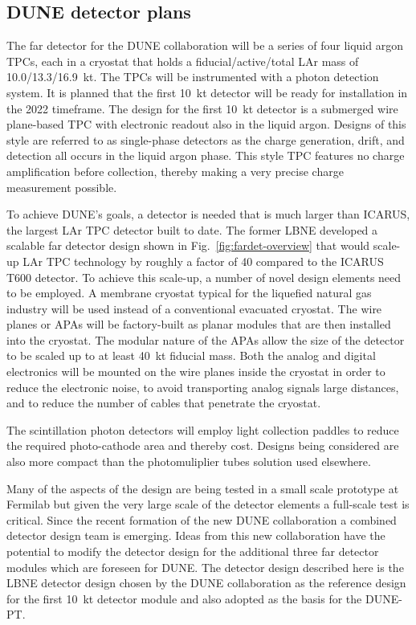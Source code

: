 \label{singlephasedet}

\subsection{DUNE detector plans}

The far detector for the DUNE collaboration will be a series of four liquid argon TPCs, each in a cryostat that holds a fiducial/active/total LAr mass of 10.0/13.3/16.9~kt. The TPCs will be instrumented with a photon detection system. It is planned that the first 10~kt detector will be ready for installation in the 2022 timeframe. 
The design for the first 10~kt detector is a submerged wire plane-based TPC with electronic readout also in the liquid argon.  Designs of this style are referred to as single-phase detectors as the charge generation, drift, and detection all occurs in the liquid argon phase.  This style TPC features no charge amplification before collection, thereby making a very precise charge measurement possible. 


To achieve DUNE's goals, a detector is needed that is much larger than ICARUS, the largest LAr TPC detector built to date. The former LBNE developed a scalable far detector design shown in Fig.~\ref{fig:fardet-overview} that would scale-up LAr TPC technology by roughly a factor of 40 compared to the ICARUS T600 detector. To achieve this scale-up, a number of novel design elements need to be employed. A membrane cryostat typical for the liquefied natural gas industry will be used instead of a conventional evacuated cryostat.  The wire planes or APAs will be factory-built as planar modules that are then installed into the cryostat. The modular nature of the APAs allow the size of the detector to be scaled up to at least 40~kt fiducial mass. Both the analog and digital electronics will be mounted on the wire planes inside the cryostat in order to reduce the electronic noise, to avoid transporting analog signals large distances, and to reduce the number of cables that penetrate the cryostat. 

The scintillation photon detectors will employ light collection paddles to reduce the required photo-cathode area and thereby cost.  Designs being considered are also more compact than the photomuliplier tubes solution used elsewhere.

Many of the aspects of the design are being tested in a small scale prototype at Fermilab but given the very large scale of the detector elements a full-scale test is critical. 
Since the recent formation of the new DUNE collaboration a combined detector design team is emerging. 
Ideas from this new collaboration have the potential to modify the detector design for the additional three far detector modules
which are foreseen for DUNE.
The detector design described here is the LBNE detector design chosen by the DUNE collaboration as the reference design for the first 10~kt 
detector module and also adopted as the basis for the DUNE-PT.


